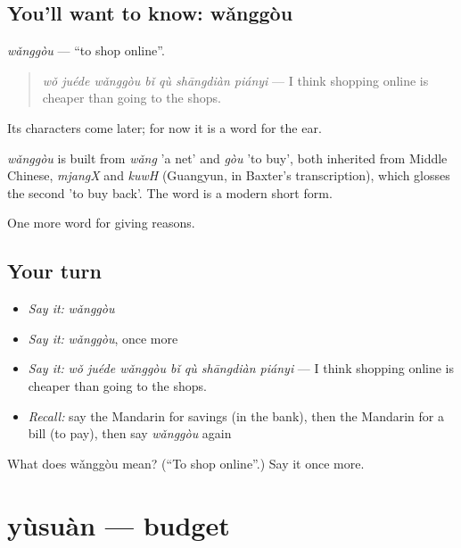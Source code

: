 \subsection*{You'll want to know: wǎnggòu}
\emph{wǎnggòu} — \textquotedblleft{}to shop online\textquotedblright{}.

\begin{quote}
\emph{wǒ juéde wǎnggòu bǐ qù shāngdiàn piányi} — I think shopping online is cheaper than going to the shops.
\end{quote}

Its characters come later; for now it is a word for the ear.

\begin{cousinweb}
\emph{wǎnggòu} is built from \emph{wǎng} 'a net' and \emph{gòu} 'to buy', both inherited from Middle Chinese, \emph{mjangX} and \emph{kuwH} (Guangyun, in Baxter's transcription), which glosses the second 'to buy back'. The word is a modern short form.
\end{cousinweb}

\begin{grammarlens}[title={What you've built}]
One more word for giving reasons.
\end{grammarlens}

\subsection*{Your turn}
\begin{itemize}
\raggedright
  \item \emph{Say it:} \emph{wǎnggòu}
  \item \emph{Say it:} \emph{wǎnggòu}, once more
  \item \emph{Say it:} \emph{wǒ juéde wǎnggòu bǐ qù shāngdiàn piányi} — I think shopping online is cheaper than going to the shops.
  \item \emph{Recall:} say the Mandarin for savings (in the bank), then the Mandarin for a bill (to pay), then say \emph{wǎnggòu} again
\end{itemize}

\begin{tcolorbox}[breakable,colback=teal!4,colframe=teal!35!black,title={Before you move on}]
What does wǎnggòu mean? (\textquotedblleft{}To shop online\textquotedblright{}.) Say it once more.
\end{tcolorbox}
\section[yùsuàn]{yùsuàn — budget}

